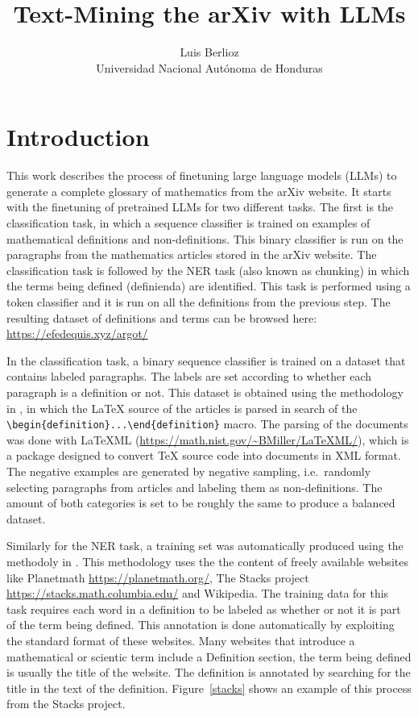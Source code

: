 \documentclass{article}
\title{Text-Mining the arXiv with LLMs}
\author{Luis Berlioz\\
    Universidad Nacional Autónoma de Honduras}
\begin{document}
\begin{abstract}
    
\end{abstract}
\section{Introduction}

This work describes the process of finetuning large language models (LLMs) to generate a complete glossary of mathematics from the arXiv website.  It starts with the finetuning of pretrained LLMs for two different tasks. The first is the classification task, in which a sequence classifier is trained on examples of mathematical definitions and non-definitions. This binary classifier is run on the paragraphs from the mathematics articles stored in the arXiv website. The classification task is followed by the NER task (also known as chunking) in which the terms being defined (definienda) are identified. This task is performed using a token classifier and it is run on all the definitions from the previous step. The resulting dataset of definitions and terms can be browsed here: \url{https://efedequis.xyz/argot/}

In the classification task, a binary sequence classifier is trained on a dataset that contains labeled paragraphs. The labels are set according to whether each paragraph is a definition or not. This dataset is obtained using the methodology in \cite{Deyan1}, in which the \LaTeX{} source of the articles is parsed in search of the \verb|\begin{definition}...\end{definition}| macro. The parsing of the documents was done with LaTeXML (\url{https://math.nist.gov/~BMiller/LaTeXML/}), which is a package designed to convert \TeX{} source code into documents in XML format. 
The negative examples are generated by negative sampling, i.e.\ randomly selecting paragraphs from articles and labeling them as non-definitions. The amount of both categories is set to be roughly the same to produce a balanced dataset. 

Similarly for the NER task, a training set was automatically produced using the methodoly in \cite{scss}. This methodology uses the the content of freely available websites like Planetmath \url{https://planetmath.org/}, The Stacks project \url{https://stacks.math.columbia.edu/} and Wikipedia. The training data for this task requires each word in a definition to be labeled as whether or not it is part of the term being defined. This annotation is done automatically by exploiting the standard format of these websites. Many websites that introduce a mathematical or scientic term include a Definition section, the term being defined is usually the title of the website. The definition is annotated by searching for the title in the text of the definition. Figure~\ref{stacks} shows an example of this process from the Stacks project.
\end{document}

